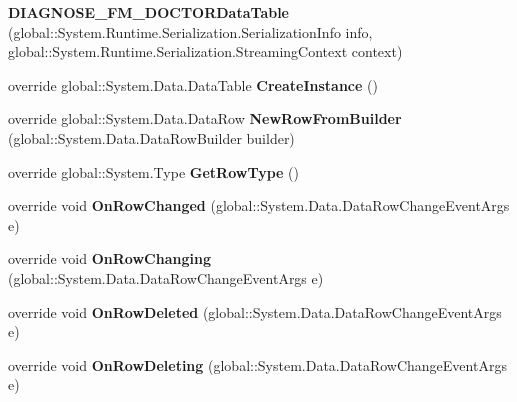 \begin{CompactItemize}
\item 
\textbf{DIAGNOSE\_\-FM\_\-DOCTORDataTable} (global::System.Runtime.Serialization.SerializationInfo info, global::System.Runtime.Serialization.StreamingContext context)\label{class_automatic_medical_system_1_1_data_set2_1_1_d_i_a_g_n_o_s_e___f_m___d_o_c_t_o_r_data_table_8e7c32b149d6bb70561977830dd31682}

\item 
override global::System.Data.DataTable \textbf{CreateInstance} ()\label{class_automatic_medical_system_1_1_data_set2_1_1_d_i_a_g_n_o_s_e___f_m___d_o_c_t_o_r_data_table_8f215e8b5e10ef8b34f02fc718e0b061}

\item 
override global::System.Data.DataRow \textbf{NewRowFromBuilder} (global::System.Data.DataRowBuilder builder)\label{class_automatic_medical_system_1_1_data_set2_1_1_d_i_a_g_n_o_s_e___f_m___d_o_c_t_o_r_data_table_eb2c4eb566de7dd8f10d391f4ba645fc}

\item 
override global::System.Type \textbf{GetRowType} ()\label{class_automatic_medical_system_1_1_data_set2_1_1_d_i_a_g_n_o_s_e___f_m___d_o_c_t_o_r_data_table_eb4a0d07e700947d9eecdf05268dc6f4}

\item 
override void \textbf{OnRowChanged} (global::System.Data.DataRowChangeEventArgs e)\label{class_automatic_medical_system_1_1_data_set2_1_1_d_i_a_g_n_o_s_e___f_m___d_o_c_t_o_r_data_table_fa00c9edfa0a5c01976354de8f31c153}

\item 
override void \textbf{OnRowChanging} (global::System.Data.DataRowChangeEventArgs e)\label{class_automatic_medical_system_1_1_data_set2_1_1_d_i_a_g_n_o_s_e___f_m___d_o_c_t_o_r_data_table_68a1c1469925935e6eb622f868c89cdb}

\item 
override void \textbf{OnRowDeleted} (global::System.Data.DataRowChangeEventArgs e)\label{class_automatic_medical_system_1_1_data_set2_1_1_d_i_a_g_n_o_s_e___f_m___d_o_c_t_o_r_data_table_1f2502c5ae49768a9b4c155594bd0a76}

\item 
override void \textbf{OnRowDeleting} (global::System.Data.DataRowChangeEventArgs e)\label{class_automatic_medical_system_1_1_data_set2_1_1_d_i_a_g_n_o_s_e___f_m___d_o_c_t_o_r_data_table_08a329dd1a87a8611b8f8a45f8b821e6}

\end{CompactItemize}
